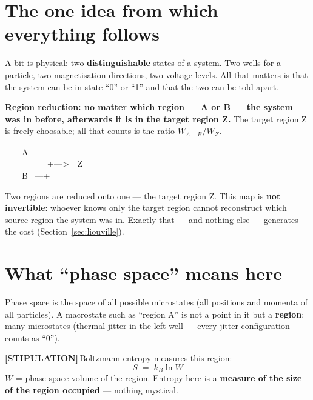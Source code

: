 \documentclass[11pt,a4paper]{article}
\newcommand{\LS}{\textcolor{laySet}{\textbf{\footnotesize\textsf{[STIPULATION]}}}\,}
\begin{document}
\section{The one idea from which everything follows}

A bit is physical: two \textbf{distinguishable} states of a system. Two wells for
a particle, two magnetisation directions, two voltage levels. All that matters is
that the system can be in state “0” or “1” and that the two can be told apart.

\textbf{Region reduction: no matter which region --- A or B --- the system was in
before, afterwards it is in the target region Z.} The target region Z is freely
choosable; all that counts is the ratio $W_{A+B}/W_Z$.

\begin{center}
\begin{minipage}{0.42\textwidth}
\ttfamily\small
\begin{tabbing}
\ \ \ \ A \ ---+\\
\ \ \ \ \ \ \ \ \ \ +--->\ \ Z\\
\ \ \ \ B \ ---+
\end{tabbing}
\end{minipage}
\end{center}

Two regions are reduced onto one --- the target region Z. This map is
\textbf{not invertible}: whoever knows only the target region cannot reconstruct
which source region the system was in. Exactly that --- and nothing else ---
generates the cost (Section~\ref{sec:liouville}).

\section{What “phase space” means here}

Phase space is the space of all possible microstates (all positions and momenta of
all particles). A macrostate such as “region A” is not a point in it but a
\textbf{region}: many microstates (thermal jitter in the left well --- every
jitter configuration counts as “0”).

\LS Boltzmann entropy measures this region:
\[
  S \;=\; k_B \ln W
\]
$W$ = phase-space volume of the region. Entropy here is a \textbf{measure of the
size of the region occupied} --- nothing mystical.
\end{document}
